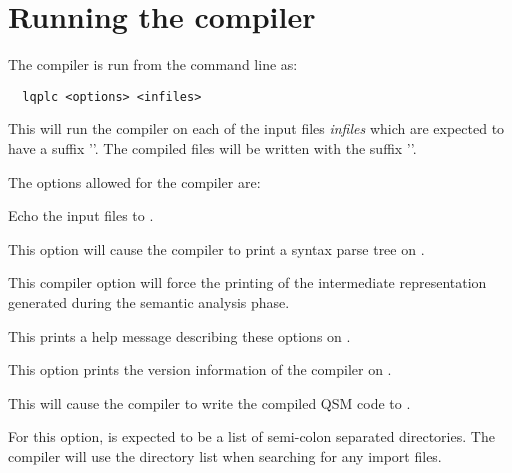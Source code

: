 \section{Running the \lqpl{} compiler}\label{appsec:runningthecompiler}
The compiler is run from the command line as:
\begin{Verbatim}
  lqplc <options> <infiles>
\end{Verbatim}

This will run the compiler on each of the input files \emph{infiles} which 
are expected to have a suffix ''. The compiled files will be 
written with the suffix ''.

The options allowed for the compiler are:
\begin{description}
\item{} Echo the input files to 
 .
\item{} This option will cause the 
compiler to print a syntax parse tree on .
\item{} This compiler option
will force the printing of the intermediate representation generated
during the semantic analysis phase.
\item{} This prints a 
help message describing these
options on .
\item{} This option prints the version information of the 
compiler on .
\item{} This will
cause the compiler to write the compiled QSM code to 
.
\item{} For this option,
 is expected to be a list of semi-colon separated
directories. The compiler will use the directory list when searching for
any  import files.
\end{description}


